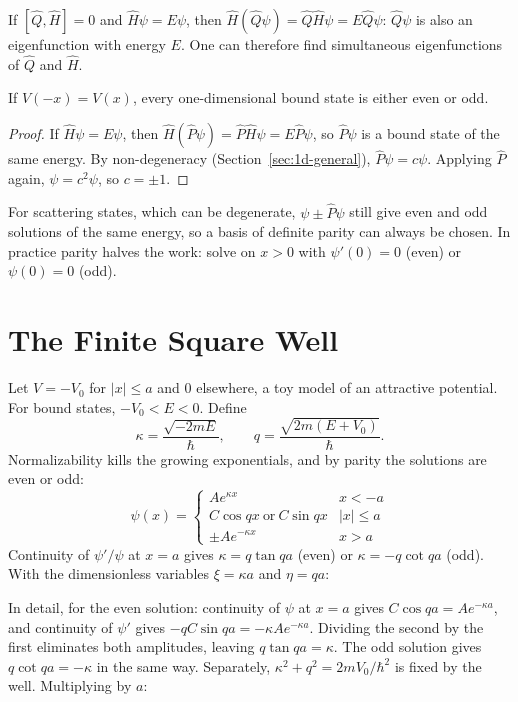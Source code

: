 \begin{theorem}
If $[\hat{Q},\hat{H}] = 0$ and $\hat{H}\psi = E\psi$, then $\hat{H}(\hat{Q}\psi) = \hat{Q}\hat{H}\psi = E\hat{Q}\psi$: $\hat{Q}\psi$ is also an eigenfunction with energy $E$. One can therefore find simultaneous eigenfunctions of $\hat{Q}$ and $\hat{H}$.
\end{theorem}

\begin{theorem}
If $V(-x) = V(x)$, every one-dimensional bound state is either even or odd.
\end{theorem}
\begin{proof}
If $\hat{H}\psi = E\psi$, then $\hat{H}(\hat{P}\psi) = \hat{P}\hat{H}\psi = E\hat{P}\psi$, so $\hat{P}\psi$ is a bound state of the same energy. By non-degeneracy (Section~\ref{sec:1d-general}), $\hat{P}\psi = c\psi$. Applying $\hat{P}$ again, $\psi = c^2\psi$, so $c = \pm1$.
\end{proof}
For scattering states, which can be degenerate, $\psi\pm\hat{P}\psi$ still give even and odd solutions of the same energy, so a basis of definite parity can always be chosen. In practice parity halves the work: solve on $x>0$ with $\psi'(0) = 0$ (even) or $\psi(0) = 0$ (odd).

\section{The Finite Square Well}

Let $V = -V_0$ for $|x|\le a$ and $0$ elsewhere, a toy model of an attractive potential. For bound states, $-V_0<E<0$. Define
\[
    \kappa = \frac{\sqrt{-2mE}}{\hbar},
    \qquad
    q = \frac{\sqrt{2m(E+V_0)}}{\hbar}.
\]
Normalizability kills the growing exponentials, and by parity the solutions are even or odd:
\[
    \psi(x) = \begin{cases}Ae^{\kappa x} & x<-a\\ C\cos qx\ \text{or}\ C\sin qx & |x|\le a\\ \pm Ae^{-\kappa x} & x>a\end{cases}
\]
Continuity of $\psi'/\psi$ at $x = a$ gives $\kappa = q\tan qa$ (even) or $\kappa = -q\cot qa$ (odd). With the dimensionless variables $\xi = \kappa a$ and $\eta = qa$:

In detail, for the even solution: continuity of $\psi$ at $x = a$ gives $C\cos qa = Ae^{-\kappa a}$, and continuity of $\psi'$ gives $-qC\sin qa = -\kappa Ae^{-\kappa a}$. Dividing the second by the first eliminates both amplitudes, leaving $q\tan qa = \kappa$. The odd solution gives $q\cot qa = -\kappa$ in the same way. Separately, $\kappa^2 + q^2 = 2mV_0/\hbar^2$ is fixed by the well. Multiplying by $a$:

